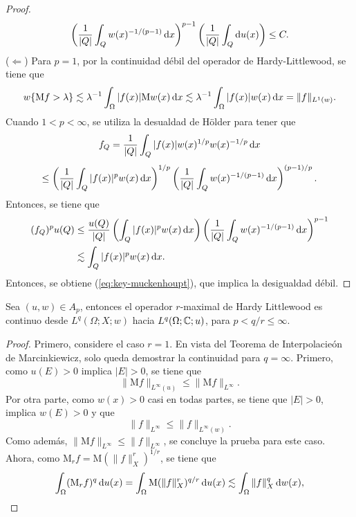 \begin{proof}
	\begin{equation*}
			\left(\frac{1}{|Q|}\int_{Q} w(x)^{-1/(p-1)}\mathop{}\!\mathrm{d} x \right)^{p-1} \left(\frac{1}{|Q|}\int_Q\mathop{}\!\mathrm{d} u(x)\right) \leq C.
	\end{equation*}
	($\Leftarrow$) Para $p=1$, por la continuidad débil del operador de Hardy-Littlewood, se tiene que 
	\begin{equation*}
		w\{\mathrm{M}f>\lambda\} \lesssim \lambda^{-1} \int_\Omega |f(x)| \mathrm{M}w(x) \mathop{}\!\mathrm{d} x \lesssim \lambda^{-1} \int_\Omega |f(x)| w(x) \mathop{}\!\mathrm{d} x = \|f\|_{L^1(w)}.
	\end{equation*}
	Cuando $1<p<\infty$, se utiliza la desualdad de H\"older para tener que 
	\begin{equation*}
		f_Q = \frac{1}{|Q|} \int_Q |f(x)|w(x)^{1/p}w(x)^{-1/p} \mathop{}\!\mathrm{d} x 
	\end{equation*}
	\begin{equation*}
		\leq \left(\frac{1}{|Q|}\int_Q  |f(x)|^pw(x)\mathop{}\!\mathrm{d} x \right)^{1/p} \left(\frac{1}{|Q|}\int_Q w(x)^{-1/(p-1)}\mathop{}\!\mathrm{d} x \right)^{(p-1)/p}.
	\end{equation*}
	Entonces, se tiene que 
	\begin{align*}
		(f_Q)^pu(Q) & \leq \frac{u(Q)}{|Q|}  \left(\int_Q  |f(x)|^pw(x)\mathop{}\!\mathrm{d} x \right) \left(\frac{1}{|Q|}\int_Q w(x)^{-1/(p-1)}\mathop{}\!\mathrm{d} x \right)^{p-1}\\ 
		&  \lesssim \int_Q  |f(x)|^pw(x)\mathop{}\!\mathrm{d} x .
	\end{align*}
	Entonces, se obtiene (\ref{eq:key-muckenhoupt}), que implica la desigualdad débil.
\end{proof}
\begin{corollary}\label{cor:muckenhoupt}
	Sea $(u, w)\in A_p$, entonces el operador $r$-maximal de Hardy Littlewood es continuo desde $L^q(\Omega; X;w)$ hacia $L^q(\Omega;\mathbb{C};u)$, para $p<q/r\leq\infty$.
\end{corollary}
\begin{proof}
	Primero, considere el caso $r=1$. En vista del Teorema de Interpolacieón de Marcinkiewicz, solo queda demostrar la continuidad para $q=\infty$. Primero, como $u(E)>0$ implica $|E|>0$, se tiene que 
	\begin{equation*}
		\|\mathrm{M}f\|_{L^\infty(u)} \leq \|\mathrm{M}f\|_{L^\infty}.
	\end{equation*}
	Por otra parte, como $w(x)>0$ casi en todas partes, se tiene que $|E|>0$, implica $w(E)>0$ y que 
	\begin{equation*}
		\|f\|_{L^\infty} \leq \|f\|_{L^\infty(w)}.
	\end{equation*}
	Como además, $\|\mathrm{M}f\|_{L^\infty} \leq \|f\|_{L^\infty}$, se concluye la prueba para este caso. Ahora, como $\mathrm{M}_rf=\mathrm{M}(\|f\|_X^r)^{1/r}$, se tiene que
	\begin{equation*}
		\int_\Omega (\mathrm{M}_rf)^q \mathop{}\!\mathrm{d} u(x) = \int_\Omega \mathrm{M}(\|f\|_X^r)^{q/r} \mathop{}\!\mathrm{d} u(x) \lesssim \int_\Omega \|f\|_X^q \mathop{}\!\mathrm{d} w(x),
	\end{equation*}
\end{proof}
